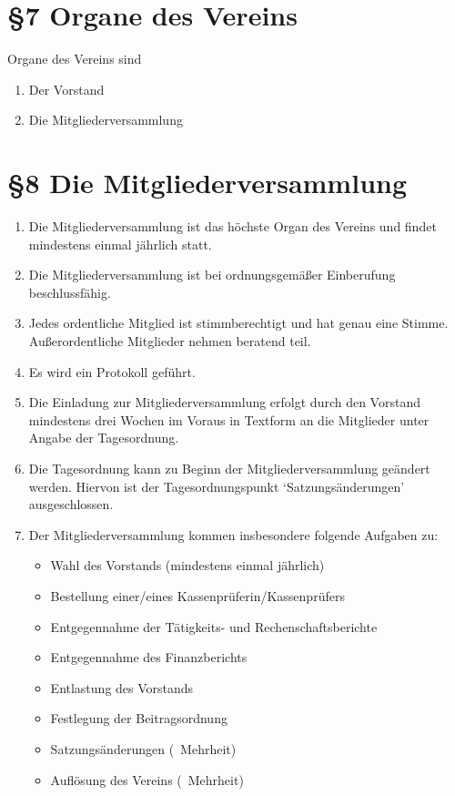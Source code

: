 \documentclass[11pt,ngerman]{article}
\begin{document}
\section*{§7 Organe des Vereins}
Organe des Vereins sind
\begin{enumerate}
 \item Der Vorstand
 \item Die Mitgliederversammlung
\end{enumerate}

\section*{§8 Die Mitgliederversammlung}
\begin{enumerate}
 \item Die Mitgliederversammlung ist das höchste Organ des Vereins und findet mindestens einmal jährlich statt.
 \item Die Mitgliederversammlung ist bei ordnungsgemäßer Einberufung beschlussfähig.
 \item Jedes ordentliche Mitglied ist stimmberechtigt und hat genau eine Stimme. Außerordentliche Mitglieder nehmen beratend teil.
 \item Es wird ein Protokoll geführt.
 \item Die Einladung zur Mitgliederversammlung erfolgt durch den Vorstand mindestens drei Wochen im Voraus in Textform an die Mitglieder unter Angabe der Tagesordnung.
 \item Die Tagesordnung kann zu Beginn der Mitgliederversammlung geändert werden. Hiervon ist der Tagesordnungspunkt `Satzungsänderungen' ausgeschlossen.
 \item Der Mitgliederversammlung kommen insbesondere folgende Aufgaben zu:
 \begin{itemize}
  \item Wahl des Vorstands (mindestens einmal jährlich)
  \item Bestellung einer/eines Kassenprüferin/Kassenprüfers
  \item Entgegennahme der Tätigkeits- und Rechenschaftsberichte
  \item Entgegennahme des Finanzberichts
  \item Entlastung des Vorstands
  \item Festlegung der Beitragsordnung
  \item Satzungsänderungen (\ Mehrheit)
  \item Auflösung des Vereins (\ Mehrheit)
 \end{itemize}
\end{enumerate}
\end{document}
